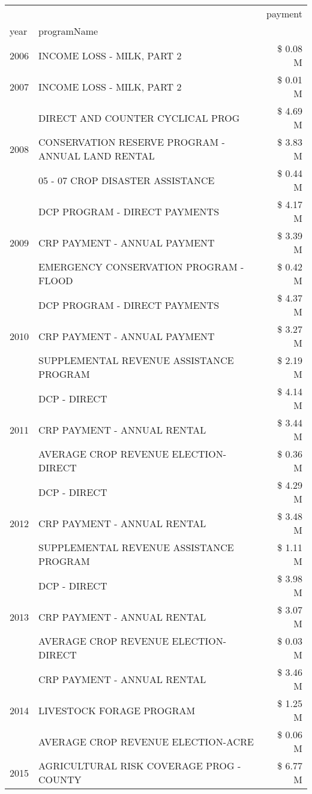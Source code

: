 \begin{tabular}{llr}
\toprule
 &  & payment \\
year & programName &  \\
\midrule
2006 & INCOME LOSS - MILK, PART 2 & \$ 0.08 M \\
\cline{1-3}
2007 & INCOME LOSS - MILK, PART 2 & \$ 0.01 M \\
\cline{1-3}
\multirow[t]{3}{*}{2008} & DIRECT AND COUNTER CYCLICAL PROG & \$ 4.69 M \\
 & CONSERVATION RESERVE PROGRAM - ANNUAL LAND RENTAL & \$ 3.83 M \\
 & 05 - 07 CROP DISASTER ASSISTANCE & \$ 0.44 M \\
\cline{1-3}
\multirow[t]{3}{*}{2009} & DCP PROGRAM - DIRECT PAYMENTS & \$ 4.17 M \\
 & CRP PAYMENT - ANNUAL PAYMENT & \$ 3.39 M \\
 & EMERGENCY CONSERVATION PROGRAM - FLOOD & \$ 0.42 M \\
\cline{1-3}
\multirow[t]{3}{*}{2010} & DCP PROGRAM - DIRECT PAYMENTS & \$ 4.37 M \\
 & CRP PAYMENT - ANNUAL PAYMENT & \$ 3.27 M \\
 & SUPPLEMENTAL REVENUE ASSISTANCE PROGRAM & \$ 2.19 M \\
\cline{1-3}
\multirow[t]{3}{*}{2011} & DCP - DIRECT & \$ 4.14 M \\
 & CRP PAYMENT - ANNUAL RENTAL & \$ 3.44 M \\
 & AVERAGE CROP REVENUE ELECTION-DIRECT & \$ 0.36 M \\
\cline{1-3}
\multirow[t]{3}{*}{2012} & DCP - DIRECT & \$ 4.29 M \\
 & CRP PAYMENT - ANNUAL RENTAL & \$ 3.48 M \\
 & SUPPLEMENTAL REVENUE ASSISTANCE PROGRAM & \$ 1.11 M \\
\cline{1-3}
\multirow[t]{3}{*}{2013} & DCP - DIRECT & \$ 3.98 M \\
 & CRP PAYMENT - ANNUAL RENTAL & \$ 3.07 M \\
 & AVERAGE CROP REVENUE ELECTION-DIRECT & \$ 0.03 M \\
\cline{1-3}
\multirow[t]{3}{*}{2014} & CRP PAYMENT - ANNUAL RENTAL & \$ 3.46 M \\
 & LIVESTOCK FORAGE PROGRAM & \$ 1.25 M \\
 & AVERAGE CROP REVENUE ELECTION-ACRE & \$ 0.06 M \\
\cline{1-3}
\multirow[t]{3}{*}{2015} & AGRICULTURAL RISK COVERAGE PROG - COUNTY & \$ 6.77 M \\

\end{tabular}
